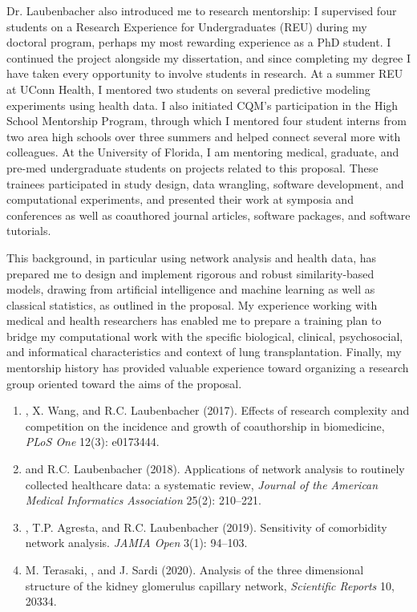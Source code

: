 \documentclass{nihbiosketch}
\begin{document}
\begin{statement}
Dr. Laubenbacher also introduced me to research mentorship: I supervised four students on a Research Experience for Undergraduates (REU) during my doctoral program, perhaps my most rewarding experience as a PhD student. I continued the project alongside my dissertation, and since completing my degree I have taken every opportunity to involve students in research. At a summer REU at UConn Health, I mentored two students on several predictive modeling experiments using health data. I also initiated CQM's participation in the High School Mentorship Program, through which I mentored four student interns from two area high schools over three summers and helped connect several more with colleagues. At the University of Florida, I am mentoring medical, graduate, and pre-med undergraduate students on projects related to this proposal. These trainees participated in study design, data wrangling, software development, and computational experiments, and presented their work at symposia and conferences as well as coauthored journal articles, software packages, and software tutorials.

This background, in particular using network analysis and health data, has prepared me to design and implement rigorous and robust similarity-based models, drawing from artificial intelligence and machine learning as well as classical statistics, as outlined in the proposal.
My experience working with medical and health researchers has enabled me to prepare a training plan to bridge my computational work with the specific biological, clinical, psychosocial, and informatical characteristics and context of lung transplantation.
Finally, my mentorship history has provided valuable experience toward organizing a research group oriented toward the aims of the proposal.

\begin{enumerate}

\item {}, X. Wang, and R.C. Laubenbacher (2017). Effects of research complexity and competition on the incidence and growth of coauthorship in biomedicine, \emph{PLoS One} 12(3): e0173444.
\item {} and R.C. Laubenbacher (2018). Applications of network analysis to routinely collected healthcare data: a systematic review, \emph{Journal of the American Medical Informatics Association} 25(2): 210--221.
\item {}, T.P. Agresta, and R.C. Laubenbacher (2019). Sensitivity of comorbidity network analysis. \emph{JAMIA Open} 3(1): 94--103.
\item M. Terasaki, , and J. Sardi (2020). Analysis of the three dimensional structure of the kidney glomerulus capillary network, \emph{Scientific Reports} 10, 20334.


\end{enumerate}
\end{statement}
\end{document}
